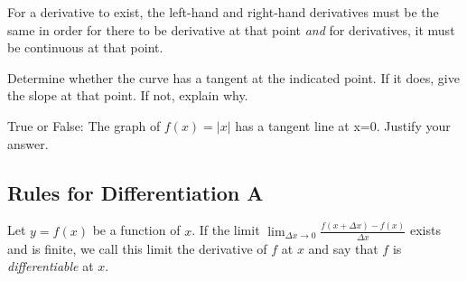 \documentclass[addpoints, 12pt]{exam}
\begin{document}
For a derivative to exist, the left-hand and right-hand derivatives must be the same in order for there to be derivative at that point \textit{and} for derivatives, it must be continuous at that point.
\begin{questions}
    \question Determine whether the curve has a tangent at the indicated point. If it does, give the slope at that point. If not, explain why.
    \question True or False: The graph of $f(x)=|x|$ has a tangent line at x=0. Justify your answer.
\end{questions}


\newpage
{}
\subsection*{Rules for Differentiation A}

Let $y=f(x)$ be a function of $x$. If the limit $\displaystyle\lim_{\Delta x\to0}\frac{f(x+\Delta x)-f(x)}{\Delta x}$ exists and is finite, we call this limit the derivative of $f$ at $x$ and say that $f$ is \textit{differentiable} at $x$.
\end{document}

